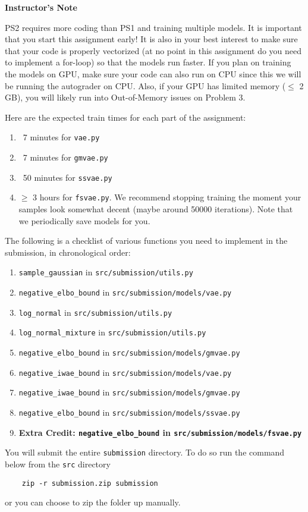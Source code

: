 \textbf{Instructor's Note}

PS2 requires more coding than PS1 and training multiple models. It is important that you
start this assignment early! It is also in your best interest to make sure that your code 
is properly vectorized (at no point in this assignment do you need to implement a for-loop) 
so that the models run faster. If you plan on training the models on GPU, make sure your 
code can also run on CPU since this we will be running the autograder on CPU. 
Also, if your GPU has limited memory ($\le$ 2 GB), you will likely run into Out-of-Memory issues on Problem 3.

Here are the expected train times for each part of the assignment:
\begin{enumerate}
    \item ~7 minutes for \texttt{vae.py}
    \item ~7 minutes for \texttt{gmvae.py}
    \item ~50 minutes for \texttt{ssvae.py}
    \item $\ge$ 3 hours for \texttt{fsvae.py}. We recommend stopping training the moment your samples
    look somewhat decent (maybe around 50000 iterations). Note that we periodically
    save models for you.
\end{enumerate}

The following is a checklist of various functions you need to implement in the
submission, in chronological order:

\begin{enumerate}
    \item \texttt{sample\_gaussian} in \texttt{src/submission/utils.py}
    \item \texttt{negative\_elbo\_bound} in \texttt{src/submission/models/vae.py}
    \item \texttt{log\_normal} in \texttt{src/submission/utils.py}
    \item \texttt{log\_normal\_mixture} in \texttt{src/submission/utils.py}
    \item \texttt{negative\_elbo\_bound} in \texttt{src/submission/models/gmvae.py}
    \item \texttt{negative\_iwae\_bound} in \texttt{src/submission/models/vae.py}
    \item \texttt{negative\_iwae\_bound} in \texttt{src/submission/models/gmvae.py}
    \item \texttt{negative\_elbo\_bound} in \texttt{src/submission/models/ssvae.py}
    \item \bf{Extra Credit}: \texttt{negative\_elbo\_bound} in \texttt{src/submission/models/fsvae.py}
\end{enumerate}

You will submit the entire \texttt{submission} directory. To do so run the command  below from the \texttt{src} directory
\begin{verbatim}
    zip -r submission.zip submission
\end{verbatim}

or you can choose to zip the folder up manually.
